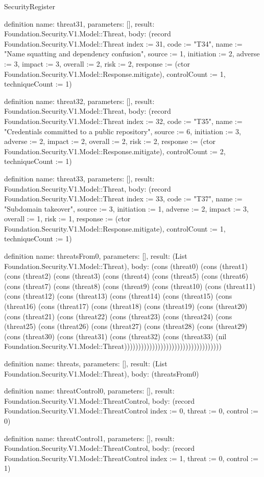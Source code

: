 \begin{lexlean}{SecurityRegister}
\begin{semanticmodule}
definition{
  name: threat31,
  parameters: [],
  result: Foundation.Security.V1.Model::Threat,
  body: (record Foundation.Security.V1.Model::Threat {index := 31, code := "T34", name := "Name squatting and dependency confusion", source := 1, initiation := 2, adverse := 3, impact := 3, overall := 2, risk := 2, response := (ctor Foundation.Security.V1.Model::Response.mitigate), controlCount := 1, techniqueCount := 1})
}

definition{
  name: threat32,
  parameters: [],
  result: Foundation.Security.V1.Model::Threat,
  body: (record Foundation.Security.V1.Model::Threat {index := 32, code := "T35", name := "Credentials committed to a public repository", source := 6, initiation := 3, adverse := 2, impact := 2, overall := 2, risk := 2, response := (ctor Foundation.Security.V1.Model::Response.mitigate), controlCount := 2, techniqueCount := 1})
}

definition{
  name: threat33,
  parameters: [],
  result: Foundation.Security.V1.Model::Threat,
  body: (record Foundation.Security.V1.Model::Threat {index := 33, code := "T37", name := "Subdomain takeover", source := 3, initiation := 1, adverse := 2, impact := 3, overall := 1, risk := 1, response := (ctor Foundation.Security.V1.Model::Response.mitigate), controlCount := 1, techniqueCount := 1})
}

definition{
  name: threatsFrom0,
  parameters: [],
  result: (List Foundation.Security.V1.Model::Threat),
  body: (cons (threat0) (cons (threat1) (cons (threat2) (cons (threat3) (cons (threat4) (cons (threat5) (cons (threat6) (cons (threat7) (cons (threat8) (cons (threat9) (cons (threat10) (cons (threat11) (cons (threat12) (cons (threat13) (cons (threat14) (cons (threat15) (cons (threat16) (cons (threat17) (cons (threat18) (cons (threat19) (cons (threat20) (cons (threat21) (cons (threat22) (cons (threat23) (cons (threat24) (cons (threat25) (cons (threat26) (cons (threat27) (cons (threat28) (cons (threat29) (cons (threat30) (cons (threat31) (cons (threat32) (cons (threat33) (nil Foundation.Security.V1.Model::Threat)))))))))))))))))))))))))))))))))))
}

definition{
  name: threats,
  parameters: [],
  result: (List Foundation.Security.V1.Model::Threat),
  body: (threatsFrom0)
}

definition{
  name: threatControl0,
  parameters: [],
  result: Foundation.Security.V1.Model::ThreatControl,
  body: (record Foundation.Security.V1.Model::ThreatControl {index := 0, threat := 0, control := 0})
}

definition{
  name: threatControl1,
  parameters: [],
  result: Foundation.Security.V1.Model::ThreatControl,
  body: (record Foundation.Security.V1.Model::ThreatControl {index := 1, threat := 0, control := 1})
}


\end{semanticmodule}
\end{lexlean}
